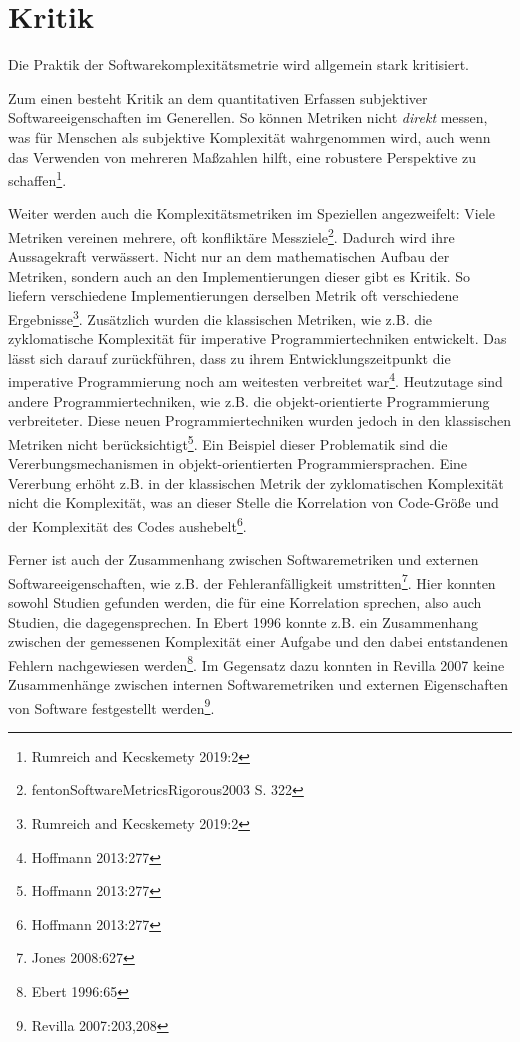 \section{Kritik}\label{kritik}

Die Praktik der Softwarekomplexitätsmetrie wird allgemein stark
kritisiert.

Zum einen besteht Kritik an dem quantitativen Erfassen subjektiver
Softwareeigenschaften im Generellen. So können Metriken nicht
\emph{direkt} messen, was für Menschen als subjektive Komplexität
wahrgenommen wird, auch wenn das Verwenden von mehreren Maßzahlen hilft,
eine robustere Perspektive zu schaffen\footnote{Rumreich and Kecskemety
  2019:2}.

Weiter werden auch die Komplexitätsmetriken im Speziellen angezweifelt:
Viele Metriken vereinen mehrere, oft konfliktäre Messziele\footnote{fentonSoftwareMetricsRigorous2003
  S. 322}. Dadurch wird ihre Aussagekraft verwässert. Nicht nur an dem
mathematischen Aufbau der Metriken, sondern auch an den
Implementierungen dieser gibt es Kritik. So liefern verschiedene
Implementierungen derselben Metrik oft verschiedene
Ergebnisse\footnote{Rumreich and Kecskemety 2019:2}. Zusätzlich wurden
die klassischen Metriken, wie z.B. die zyklomatische Komplexität für
imperative Programmiertechniken entwickelt. Das lässt sich darauf
zurückführen, dass zu ihrem Entwicklungszeitpunkt die imperative
Programmierung noch am weitesten verbreitet war\footnote{Hoffmann
  2013:277}. Heutzutage sind andere Programmiertechniken, wie z.B. die
objekt-orientierte Programmierung verbreiteter. Diese neuen
Programmiertechniken wurden jedoch in den klassischen Metriken nicht
berücksichtigt\footnote{Hoffmann 2013:277}. Ein Beispiel dieser
Problematik sind die Vererbungsmechanismen in objekt-orientierten
Programmiersprachen. Eine Vererbung erhöht z.B. in der klassischen
Metrik der zyklomatischen Komplexität nicht die Komplexität, was an
dieser Stelle die Korrelation von Code-Größe und der Komplexität des
Codes aushebelt\footnote{Hoffmann 2013:277}.

Ferner ist auch der Zusammenhang zwischen Softwaremetriken und externen
Softwareeigenschaften, wie z.B. der Fehleranfälligkeit
umstritten\footnote{Jones 2008:627}. Hier konnten sowohl Studien
gefunden werden, die für eine Korrelation sprechen, also auch Studien,
die dagegensprechen. In Ebert 1996 konnte z.B. ein Zusammenhang zwischen
der gemessenen Komplexität einer Aufgabe und den dabei entstandenen
Fehlern nachgewiesen werden\footnote{Ebert 1996:65}. Im Gegensatz dazu
konnten in Revilla 2007 keine Zusammenhänge zwischen internen
Softwaremetriken und externen Eigenschaften von Software festgestellt
werden\footnote{Revilla 2007:203,208}.

